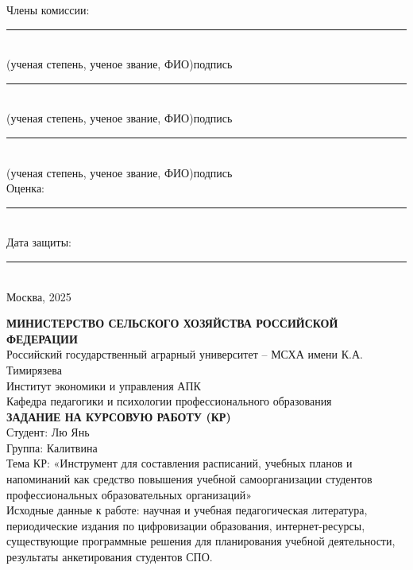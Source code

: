 \documentclass[14pt,a4paper]{article}
\begin{document}
\begin{titlepage}
Члены комиссии:\\
\rule{7cm}{0.4pt}\\
(ученая степень, ученое звание, ФИО)\qquad подпись\\[0.3cm]
\rule{7cm}{0.4pt}\\
(ученая степень, ученое звание, ФИО)\qquad подпись\\[0.3cm]
\rule{7cm}{0.4pt}\\
(ученая степень, ученое звание, ФИО)\qquad подпись\\[0.8cm]

Оценка: \rule{5cm}{0.4pt}\\
Дата защиты: \rule{5cm}{0.4pt}\\[1.5cm]

\centering
Москва, 2025
\end{titlepage}


\newpage
\centering
\textbf{МИНИСТЕРСТВО СЕЛЬСКОГО ХОЗЯЙСТВА РОССИЙСКОЙ ФЕДЕРАЦИИ}\\[0.4cm]
Российский государственный аграрный университет – МСХА имени К.А. Тимирязева\\
Институт экономики и управления АПК\\
Кафедра педагогики и психологии профессионального образования\\[1cm]

\textbf{ЗАДАНИЕ НА КУРСОВУЮ РАБОТУ (КР)}\\[1cm]

\noindent Студент: Лю Янь\\
Группа: Калитвина\\[0.4cm]

Тема КР: «Инструмент для составления расписаний, учебных планов и напоминаний как средство повышения учебной самоорганизации студентов профессиональных образовательных организаций»\\[0.6cm]

Исходные данные к работе: научная и учебная педагогическая литература, периодические издания по цифровизации образования, интернет-ресурсы, существующие программные решения для планирования учебной деятельности, результаты анкетирования студентов СПО.\\[0.6cm]
\end{document}

